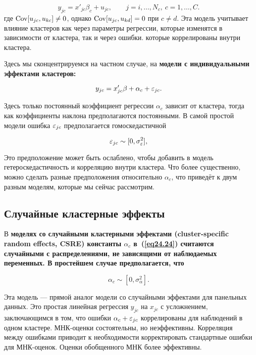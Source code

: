 \begin{equation}
\label{eq24.23}
y_{jc} = x'_{jc} \beta_c + u_{jc}, \qquad j = i, \dots , N_c, \: c = 1, \dots, C.
\end{equation}
где $\mathrm{Cov}[u_{jc}, u_{kc}] \ne 0$, однако $\mathrm{Cov}[u_{jc}, u_{kd}] = 0$ при $c \ne d$. Эта модель учитывает влияние кластеров как через параметры регрессии, которые изменятся в зависимости от кластера, так и через ошибки. которые коррелированы внутри кластера. 

Здесь мы сконцентрируемся на частном случае, на \bfseries модели с индивидуальными эффектами кластеров:\mdseries

\begin{equation}
\label{eq24.24}
y_{jc} = x'_{jc} \beta + \alpha_c + \varepsilon_{jc}.
\end{equation}

Здесь только постоянный коэффициент регрессии $\alpha_c$ зависит от кластера, тогда как коэффициенты наклона предполагаются постоянными. В самой простой модели ошибка $\varepsilon_{jc}$ предполагается гомоскедастичной

\begin{equation}
\label{eq24.25}
\varepsilon_{jc} \sim [0,\sigma^2_{\varepsilon}],
\end{equation}

Это предположение может быть ослаблено, чтобы добавить в модель гетероскедастичность и корреляцию внутри кластера. Что более существенно, можно сделать разные предположения относительно $\alpha_c$, что приведёт к двум разным моделям, которые мы сейчас рассмотрим. 

\subsection*{Случайные кластерные эффекты}

В \bfseries моделях со случайными кластерными эффектами \mdseries (cluster-specific random effects, CSRE) константы $\alpha_c$ в~(\ref{eq24.24}) считаются случайными с распределениями, не зависящими от наблюдаемых переменных. В простейшем случае предполагается, что

\begin{equation}
\label{eq24.26}
\alpha_c \sim [0, \sigma^2_{\alpha}].
\end{equation}

Эта модель --- прямой аналог модели со случайными эффектами для панельных данных. Это простая линейная регрессия $y_{jc}$ на $x_{jc}$ с усложнением, заключающимся в том, что ошибки $\alpha_c + \varepsilon_{jc}$ коррелированы для наблюдений в одном кластере. МНК-оценки состоятельны, но неэффективны. Корреляция между ошибками приводит к необходимости корректировать стандартные ошибки для МНК-оценок. Оценки обобщенного МНК более эффективны. 

